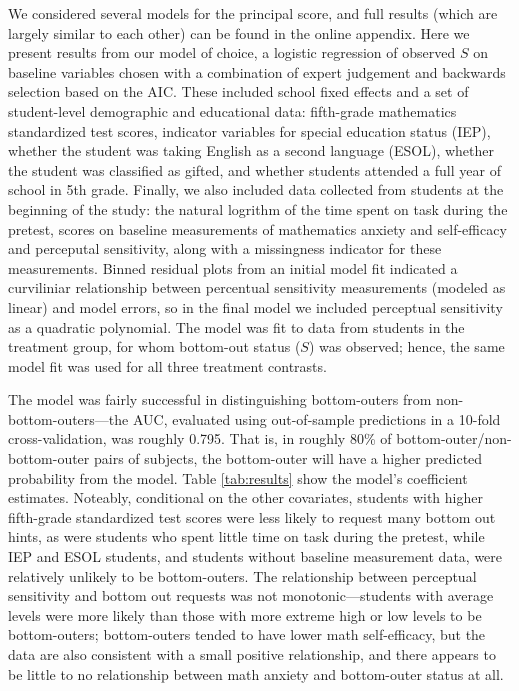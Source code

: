 \documentclass[11pt]{article} %
\begin{document}
We considered several models for the principal score, and full results (which are largely similar to each other) can be found in the online appendix. Here we present results from our model of choice, a logistic regression of observed $S$ on baseline variables chosen with a combination of expert judgement and backwards selection based on the AIC. These included school fixed effects and a set of student-level demographic and educational data: fifth-grade mathematics standardized test scores, %
indicator variables for special education status (IEP), whether the student was taking English as a second language (ESOL), whether the student was classified as gifted, and whether students attended a full year of school in 5th grade. Finally, we also included data collected from students at the beginning of the study: the natural logrithm of the  time spent on task during the pretest, scores on baseline measurements of mathematics anxiety and self-efficacy and perceputal sensitivity, along with a missingness indicator for these measurements.
Binned residual plots \citep{gelman2006data} from an initial model fit indicated a curviliniar relationship between percentual sensitivity measurements (modeled as linear) and model errors, so in the final model we included perceptual sensitivity as a quadratic polynomial.
The model was fit to data from students in the treatment group, for whom bottom-out status ($S$) was observed; hence, the same model fit was used for all three treatment contrasts.

The model was fairly successful in distinguishing bottom-outers from non-bottom-outers---the AUC, evaluated using out-of-sample predictions in a 10-fold cross-validation, was roughly 0.795. That is, in roughly 80\% of bottom-outer/non-bottom-outer pairs of subjects, the bottom-outer will have a higher predicted probability from the model.
Table \ref{tab:results} show the model's coefficient estimates. Noteably, conditional on the other covariates, students with higher fifth-grade standardized test scores were less likely to request many bottom out hints, as were students who spent little time on task during the pretest, while IEP and ESOL students, and students without baseline measurement data, were relatively unlikely to be bottom-outers. The relationship between perceptual sensitivity and bottom out requests was not monotonic---students with average levels were more likely than those with more extreme high or low levels to be bottom-outers; bottom-outers tended to have lower math self-efficacy, but the data are also consistent with a small positive relationship, and there appears to be little to no relationship between math anxiety and bottom-outer status at all.
\end{document}
